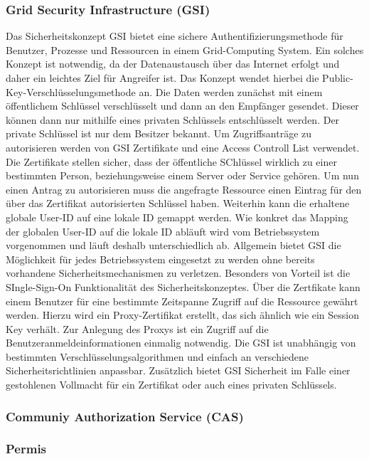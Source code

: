 \documentclass[utf8,biblatex]{lni}
\begin{document}
\subsubsection{Grid Security Infrastructure (GSI)}
 Das Sicherheitskonzept GSI bietet eine sichere Authentifizierungsmethode für Benutzer, Prozesse und Ressourcen in einem Grid-Computing System.
 Ein solches Konzept ist notwendig, da der Datenaustausch über das Internet erfolgt und daher ein leichtes Ziel für Angreifer ist. Das Konzept wendet hierbei die 
 Public-Key-Verschlüsselungsmethode an. Die Daten werden zunächst mit einem öffentlichem Schlüssel verschlüsselt und dann an den Empfänger gesendet. Dieser können dann nur mithilfe
 eines privaten Schlüssels entschlüsselt werden. Der private Schlüssel ist nur dem Besitzer bekannt. Um Zugriffsanträge zu autorisieren werden von GSI Zertifikate und 
 eine Access Controll List verwendet. Die Zertifikate stellen sicher, dass der öffentliche SChlüssel wirklich zu einer bestimmten Person, beziehungsweise einem Server oder Service gehören. 
 Um nun einen Antrag zu autorisieren muss die angefragte Ressource einen Eintrag für den über das Zertifikat autorisierten Schlüssel haben. Weiterhin kann die erhaltene globale User-ID auf 
 eine lokale ID gemappt werden. Wie konkret das Mapping der globalen User-ID auf die lokale ID abläuft wird vom Betriebssystem vorgenommen und läuft deshalb unterschiedlich ab.
 Allgemein bietet GSI die Möglichkeit für jedes Betriebssystem eingesetzt zu werden ohne bereits vorhandene Sicherheitsmechanismen zu verletzen. Besonders von Vorteil ist die 
 SIngle-Sign-On Funktionalität des Sicherheitskonzeptes. Über die Zertfikate kann einem Benutzer für eine bestimmte Zeitspanne Zugriff auf die Ressource gewährt werden. Hierzu wird ein Proxy-Zertifikat erstellt, das
 sich ähnlich wie ein Session Key verhält. Zur Anlegung des Proxys ist ein Zugriff auf die Benutzeranmeldeinformationen einmalig notwendig. Die GSI ist unabhängig von bestimmten Verschlüsselungsalgorithmen
 und einfach an verschiedene Sicherheitsrichtlinien anpassbar. Zusätzlich bietet GSI Sicherheit im Falle einer gestohlenen Vollmacht für ein Zertifikat oder auch eines privaten Schlüssels.

\subsubsection{Communiy Authorization Service (CAS)}

\subsubsection{Permis}
\end{document}
